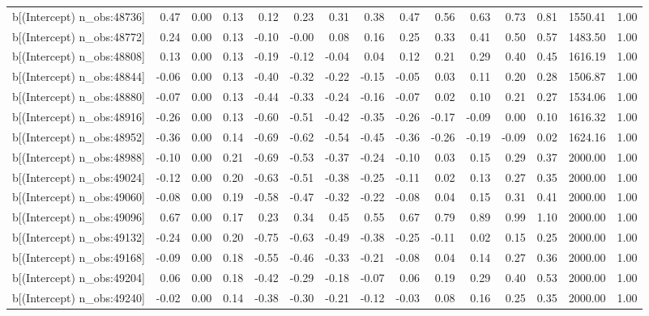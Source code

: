 \begin{table}[ht]
\begin{tabular}{rrrrrrrrrrrrrrr}
  b[(Intercept) n\_obs:48736] & 0.47 & 0.00 & 0.13 & 0.12 & 0.23 & 0.31 & 0.38 & 0.47 & 0.56 & 0.63 & 0.73 & 0.81 & 1550.41 & 1.00 \\ 
  b[(Intercept) n\_obs:48772] & 0.24 & 0.00 & 0.13 & -0.10 & -0.00 & 0.08 & 0.16 & 0.25 & 0.33 & 0.41 & 0.50 & 0.57 & 1483.50 & 1.00 \\ 
  b[(Intercept) n\_obs:48808] & 0.13 & 0.00 & 0.13 & -0.19 & -0.12 & -0.04 & 0.04 & 0.12 & 0.21 & 0.29 & 0.40 & 0.45 & 1616.19 & 1.00 \\ 
  b[(Intercept) n\_obs:48844] & -0.06 & 0.00 & 0.13 & -0.40 & -0.32 & -0.22 & -0.15 & -0.05 & 0.03 & 0.11 & 0.20 & 0.28 & 1506.87 & 1.00 \\ 
  b[(Intercept) n\_obs:48880] & -0.07 & 0.00 & 0.13 & -0.44 & -0.33 & -0.24 & -0.16 & -0.07 & 0.02 & 0.10 & 0.21 & 0.27 & 1534.06 & 1.00 \\ 
  b[(Intercept) n\_obs:48916] & -0.26 & 0.00 & 0.13 & -0.60 & -0.51 & -0.42 & -0.35 & -0.26 & -0.17 & -0.09 & 0.00 & 0.10 & 1616.32 & 1.00 \\ 
  b[(Intercept) n\_obs:48952] & -0.36 & 0.00 & 0.14 & -0.69 & -0.62 & -0.54 & -0.45 & -0.36 & -0.26 & -0.19 & -0.09 & 0.02 & 1624.16 & 1.00 \\ 
  b[(Intercept) n\_obs:48988] & -0.10 & 0.00 & 0.21 & -0.69 & -0.53 & -0.37 & -0.24 & -0.10 & 0.03 & 0.15 & 0.29 & 0.37 & 2000.00 & 1.00 \\ 
  b[(Intercept) n\_obs:49024] & -0.12 & 0.00 & 0.20 & -0.63 & -0.51 & -0.38 & -0.25 & -0.11 & 0.02 & 0.13 & 0.27 & 0.35 & 2000.00 & 1.00 \\ 
  b[(Intercept) n\_obs:49060] & -0.08 & 0.00 & 0.19 & -0.58 & -0.47 & -0.32 & -0.22 & -0.08 & 0.04 & 0.15 & 0.31 & 0.41 & 2000.00 & 1.00 \\ 
  b[(Intercept) n\_obs:49096] & 0.67 & 0.00 & 0.17 & 0.23 & 0.34 & 0.45 & 0.55 & 0.67 & 0.79 & 0.89 & 0.99 & 1.10 & 2000.00 & 1.00 \\ 
  b[(Intercept) n\_obs:49132] & -0.24 & 0.00 & 0.20 & -0.75 & -0.63 & -0.49 & -0.38 & -0.25 & -0.11 & 0.02 & 0.15 & 0.25 & 2000.00 & 1.00 \\ 
  b[(Intercept) n\_obs:49168] & -0.09 & 0.00 & 0.18 & -0.55 & -0.46 & -0.33 & -0.21 & -0.08 & 0.04 & 0.14 & 0.27 & 0.36 & 2000.00 & 1.00 \\ 
  b[(Intercept) n\_obs:49204] & 0.06 & 0.00 & 0.18 & -0.42 & -0.29 & -0.18 & -0.07 & 0.06 & 0.19 & 0.29 & 0.40 & 0.53 & 2000.00 & 1.00 \\ 
  b[(Intercept) n\_obs:49240] & -0.02 & 0.00 & 0.14 & -0.38 & -0.30 & -0.21 & -0.12 & -0.03 & 0.08 & 0.16 & 0.25 & 0.35 & 2000.00 & 1.00 \\ 

\end{tabular}
\end{table}
